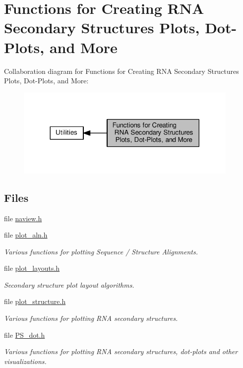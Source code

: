 \hypertarget{group__plotting__utils}{}\section{Functions for Creating R\+N\+A Secondary Structures Plots, Dot-\/\+Plots, and More}
\label{group__plotting__utils}
Collaboration diagram for Functions for Creating R\+N\+A Secondary Structures Plots, Dot-\/\+Plots, and More\+:
\nopagebreak
\begin{figure}[H]
\begin{center}
\leavevmode
\includegraphics[width=305pt]{group__plotting__utils}
\end{center}
\end{figure}
\subsection*{Files}
\begin{DoxyCompactItemize}
\item 
file \hyperlink{naview_8h}{naview.\+h}
\item 
file \hyperlink{plot__aln_8h}{plot\+\_\+aln.\+h}
\begin{DoxyCompactList}\small\item\em Various functions for plotting Sequence / Structure Alignments. \end{DoxyCompactList}\item 
file \hyperlink{plot__layouts_8h}{plot\+\_\+layouts.\+h}
\begin{DoxyCompactList}\small\item\em Secondary structure plot layout algorithms. \end{DoxyCompactList}\item 
file \hyperlink{plot__structure_8h}{plot\+\_\+structure.\+h}
\begin{DoxyCompactList}\small\item\em Various functions for plotting R\+N\+A secondary structures. \end{DoxyCompactList}\item 
file \hyperlink{PS__dot_8h}{P\+S\+\_\+dot.\+h}
\begin{DoxyCompactList}\small\item\em Various functions for plotting R\+N\+A secondary structures, dot-\/plots and other visualizations. \end{DoxyCompactList}\end{DoxyCompactItemize}
